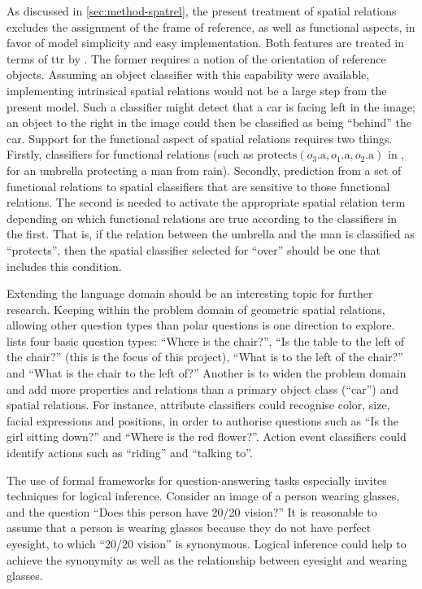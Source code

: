 As discussed in \autoref{sec:method-spatrel}, the present treatment of spatial relations excludes the assignment of the frame of reference, as well as functional aspects, in favor of model simplicity and easy implementation.
Both features are treated in terms of \gls{ttr} by \cite{ttrspat}.
The former requires a notion of the orientation of reference objects.
Assuming an object classifier with this capability were available, implementing intrinsical spatial relations would not be a large step from the present model.
Such a classifier might detect that a car is facing left in the image;
an object to the right in the image could then be classified as being ``behind'' the car.
Support for the functional aspect of spatial relations requires two things.
Firstly, classifiers for functional relations (such as $\text{protects}(o_3\text{.a}, o_1\text{.a}, o_2\text{.a})$ in \cite{ttrspat}, for an umbrella protecting a man from rain).
Secondly, prediction from a set of functional relations to spatial classifiers that are sensitive to those functional relations.
The second is needed to activate the appropriate spatial relation term depending on which functional relations are true according to the classifiers in the first.
That is, if the relation between the umbrella and the man is classified as ``protects'', then the spatial classifier selected for ``over'' should be one that includes this condition.

Extending the language domain should be an interesting topic for further research.
Keeping within the problem domain of geometric spatial relations, allowing other question types than polar questions is one direction to explore.
\citet[p. 156]{DobnikTeachingmobilerobots2009} lists four basic question types:
``Where is the chair?'',
``Is the table to the left of the chair?'' (this is the focus of this project),
``What is to the left of the chair?'' and
``What is the chair to the left of?''
Another is to widen the problem domain and add more properties and relations than a primary object class (``car'') and spatial relations.
For instance, attribute classifiers could recognise color, size, facial expressions and positions, in order to authorise questions such as ``Is the girl sitting down?'' and ``Where is the red flower?''.
Action event classifiers could identify actions such as ``riding'' and ``talking to''.

The use of formal frameworks for question-answering tasks especially invites techniques for logical inference.
Consider an image of a person wearing glasses, and the question ``Does this person have 20/20 vision?''
It is reasonable to assume that a person is wearing glasses because they do not have perfect eyesight, to which ``20/20 vision'' is synonymous.
Logical inference could help to achieve the synonymity as well as the relationship between eyesight and wearing glasses.


